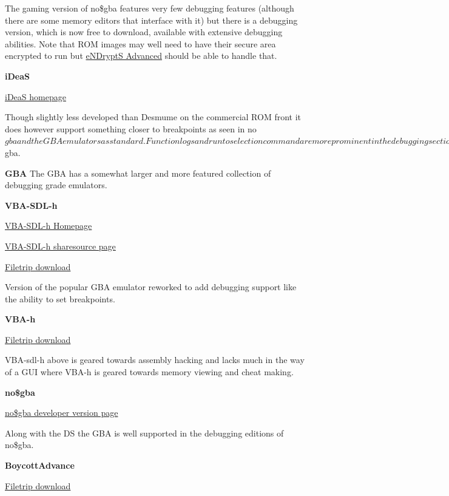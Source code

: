 \documentclass[
]{book}
\begin{document}
The gaming version of no\$gba features very few debugging features (although there are some memory editors that interface with it) but there is a debugging version, which is now free to download, available with extensive debugging abilities. Note that ROM images may well need to have their secure area encrypted to run but \href{http://www.no-intro.org/tools.htm}{eNDryptS Advanced} should be able to handle that.

\textbf{iDeaS}

\href{http://ciacin.site90.com/ideas.php}{iDeaS homepage}

Though slightly less developed than Desmume on the commercial ROM front it does however support something closer to breakpoints as seen in no\(gba and the GBA emulators as standard. Function logs and run to selection command are more prominent in the debugging section though and it is not quite a full replacement for no\)gba.

\textbf{GBA} The GBA has a somewhat larger and more featured collection of debugging grade emulators.

\textbf{VBA-SDL-h}

\href{http://labmaster.bios.net.nz/vba-sdl-h/}{VBA-SDL-h Homepage}

\href{http://sharesource.org/project/vbasdlh/}{VBA-SDL-h sharesource page}

\href{http://filetrip.net/gba-downloads/emulators/download-vba-sdl-h-r070904a-f28914.html}{Filetrip download}

Version of the popular GBA emulator reworked to add debugging support like the ability to set breakpoints.

\textbf{VBA-h}

\href{http://filetrip.net/gba-downloads/emulators/download-vba-h-172-f28913.html}{Filetrip download}

VBA-sdl-h above is geared towards assembly hacking and lacks much in the way of a GUI where VBA-h is geared towards memory viewing and cheat making.

\textbf{no\$gba}

\href{http://problemkaputt.de/gba-dev.htm}{no\$gba developer version page}

Along with the DS the GBA is well supported in the debugging editions of no\$gba.

\textbf{BoycottAdvance}

\href{http://filetrip.net/gba-downloads/emulators/download-boycottadvance-028-windows-f28912.html}{Filetrip download}
\end{document}

